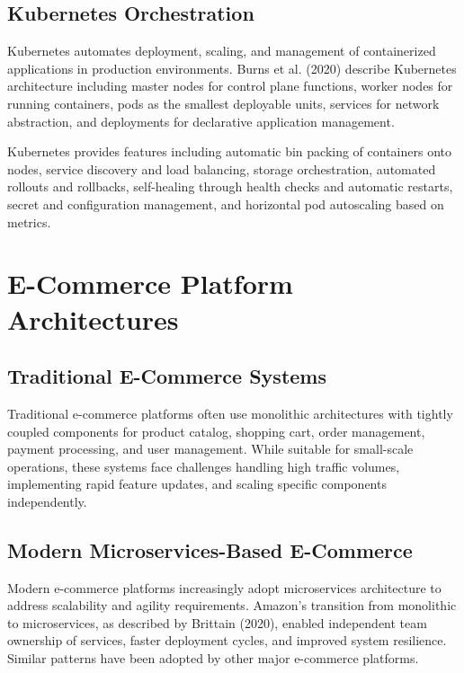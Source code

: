 \subsection{Kubernetes Orchestration}

Kubernetes automates deployment, scaling, and management of containerized applications in production environments. Burns et al. (2020) describe Kubernetes architecture including master nodes for control plane functions, worker nodes for running containers, pods as the smallest deployable units, services for network abstraction, and deployments for declarative application management.

Kubernetes provides features including automatic bin packing of containers onto nodes, service discovery and load balancing, storage orchestration, automated rollouts and rollbacks, self-healing through health checks and automatic restarts, secret and configuration management, and horizontal pod autoscaling based on metrics.

\section{E-Commerce Platform Architectures}

\subsection{Traditional E-Commerce Systems}

Traditional e-commerce platforms often use monolithic architectures with tightly coupled components for product catalog, shopping cart, order management, payment processing, and user management. While suitable for small-scale operations, these systems face challenges handling high traffic volumes, implementing rapid feature updates, and scaling specific components independently.

\subsection{Modern Microservices-Based E-Commerce}

Modern e-commerce platforms increasingly adopt microservices architecture to address scalability and agility requirements. Amazon's transition from monolithic to microservices, as described by Brittain (2020), enabled independent team ownership of services, faster deployment cycles, and improved system resilience. Similar patterns have been adopted by other major e-commerce platforms.

